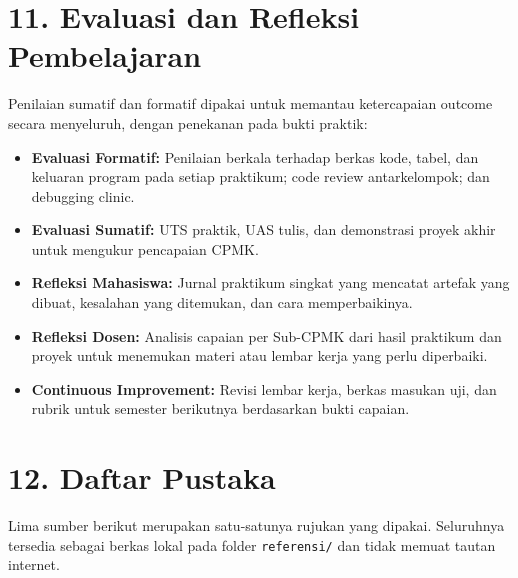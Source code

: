 \documentclass[12pt,a4paper]{article}
\begin{document}
\section*{11. Evaluasi dan Refleksi Pembelajaran}

Penilaian sumatif dan formatif dipakai untuk memantau ketercapaian outcome secara menyeluruh, dengan penekanan pada bukti praktik:

\begin{itemize}[leftmargin=*]
  \item \textbf{Evaluasi Formatif:} Penilaian berkala terhadap berkas kode, tabel, dan keluaran program pada setiap praktikum; code review antarkelompok; dan debugging clinic.
  \item \textbf{Evaluasi Sumatif:} UTS praktik, UAS tulis, dan demonstrasi proyek akhir untuk mengukur pencapaian CPMK.
  \item \textbf{Refleksi Mahasiswa:} Jurnal praktikum singkat yang mencatat artefak yang dibuat, kesalahan yang ditemukan, dan cara memperbaikinya.
  \item \textbf{Refleksi Dosen:} Analisis capaian per Sub-CPMK dari hasil praktikum dan proyek untuk menemukan materi atau lembar kerja yang perlu diperbaiki.
  \item \textbf{Continuous Improvement:} Revisi lembar kerja, berkas masukan uji, dan rubrik untuk semester berikutnya berdasarkan bukti capaian.
\end{itemize}

\vspace{0.5cm}

\section*{12. Daftar Pustaka}

Lima sumber berikut merupakan satu-satunya rujukan yang dipakai. Seluruhnya tersedia sebagai berkas lokal pada folder \texttt{referensi/} dan tidak memuat tautan internet.
\end{document}
